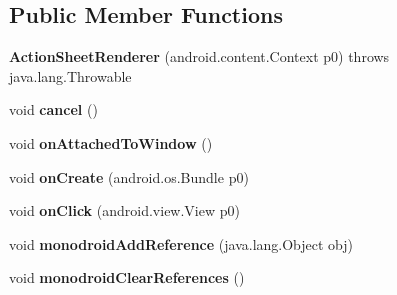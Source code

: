 \subsection*{Public Member Functions}
\begin{DoxyCompactItemize}
\item 
\mbox{\label{classmd5b60ffeb829f638581ab2bb9b1a7f4f3f_1_1ActionSheetRenderer_a477e90d5625841d42397451016a2083b}} 
{\bfseries Action\+Sheet\+Renderer} (android.\+content.\+Context p0)  throws java.\+lang.\+Throwable 	
\item 
\mbox{\label{classmd5b60ffeb829f638581ab2bb9b1a7f4f3f_1_1ActionSheetRenderer_a213358af9f3f2aee0abeeae66788d604}} 
void {\bfseries cancel} ()
\item 
\mbox{\label{classmd5b60ffeb829f638581ab2bb9b1a7f4f3f_1_1ActionSheetRenderer_a13de0c252c4cc2e9e3f02887c8673f47}} 
void {\bfseries on\+Attached\+To\+Window} ()
\item 
\mbox{\label{classmd5b60ffeb829f638581ab2bb9b1a7f4f3f_1_1ActionSheetRenderer_a4bcaeebda1585db4eb18c4353482bf5e}} 
void {\bfseries on\+Create} (android.\+os.\+Bundle p0)
\item 
\mbox{\label{classmd5b60ffeb829f638581ab2bb9b1a7f4f3f_1_1ActionSheetRenderer_a5df38c7adc6079f99eaf47b19cbb7974}} 
void {\bfseries on\+Click} (android.\+view.\+View p0)
\item 
\mbox{\label{classmd5b60ffeb829f638581ab2bb9b1a7f4f3f_1_1ActionSheetRenderer_af8ffa136f84a4104367ca2047aad806b}} 
void {\bfseries monodroid\+Add\+Reference} (java.\+lang.\+Object obj)
\item 
\mbox{\label{classmd5b60ffeb829f638581ab2bb9b1a7f4f3f_1_1ActionSheetRenderer_a2cba29a93ba3c95ecdf5198281ec137c}} 
void {\bfseries monodroid\+Clear\+References} ()
\end{DoxyCompactItemize}
